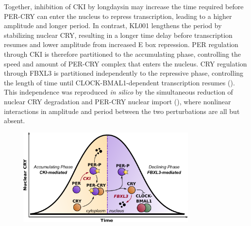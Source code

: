 Together, inhibition of CKI by longdaysin may increase the time required before PER-CRY can enter the nucleus to repress transcription, leading to a higher amplitude and longer period. 
In contrast, KL001 lengthens the period by stabilizing nuclear CRY, resulting in a longer time delay before transcription resumes and lower amplitude from increased E box repression. 
PER regulation through CKI is therefore partitioned to the accumulating phase, controlling the speed and amount of PER-CRY complex that enters the nucleus. 
CRY regulation through FBXL3 is partitioned independently to the repressive phase, controlling the length of time until CLOCK-BMAL1-dependent transcription resumes (). 
This independence was reproduced {\it in silico} by the simultaneous reduction of nuclear CRY degradation and PER-CRY nuclear import (), where nonlinear interactions in amplitude and period between the two perturbations are all but absent.

\begin{figure}[h]
  \centering
  \includegraphics[width=0.8\textwidth]{chap4/figures/fig6.pdf}
  \label{fig:46}
\end{figure}


